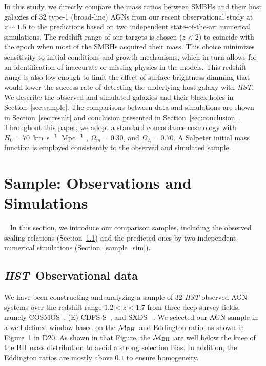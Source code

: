 \documentclass[twocolumn,trackchanges]{aastex63}
\newcommand{\hst}{{\it HST}}
\newcommand{\mbh}{$\mathcal M_{\rm BH}$}
\newcommand{\kmsMpc}{km~s$^{\rm -1}$~Mpc$^{\rm -1}$}
\begin{document}
In this study, we directly compare the mass ratios between SMBHs and their host galaxies of 32 type-1 (broad-line) AGNs from our recent observational study at $z\sim1.5$ \citep{Ding2020} to the predictions based on two independent state-of-the-art numerical simulations. The redshift range of our targets is chosen ($z<2$) to coincide with the epoch when most of the SMBHs acquired their mass. This choice minimizes sensitivity to initial conditions and growth mechanisms, which in turn allows for an identification of inaccurate or missing physics in the models. This redshift range is also low enough to limit the effect of surface brightness dimming that would lower the success rate of detecting the underlying host galaxy with \hst. We describe the observed and simulated galaxies and their black holes in Section~\ref{sec:sample}. The comparisons between data and simulations are shown in Section~\ref{sec:result} and conclusion presented in Section~\ref{sec:conclusion}. Throughout this paper, we adopt a standard concordance
cosmology with $H_0 = 70$~\kmsMpc
, $\Omega_m = 0.30$,
and $\Omega_\Lambda = 0.70$. A Salpeter initial mass function is employed consistently to the
observed and simulated sample.


\section{Sample: Observations and Simulations}~\label{sec:sample}
In this section, we introduce our comparison samples, including the observed scaling relations (Section~\ref{hst_sample}) and the predicted ones by two independent numerical simulations (Section~\ref{sample_sim}).
	
\subsection{\hst\ Observational data}\label{hst_sample}
	
We have been constructing and analyzing a sample of 32 \hst-observed AGN systems over the redshift range $1.2<z<1.7$ from three deep survey fields, namely COSMOS~\citep{Civano2016}, (E)-CDFS-S~\citep{Lehmer2005, Xue2011}, and SXDS~\citep{Ueda2008} \citep[][hereafter D20]{Ding2020}.
We selected our AGN sample in a well-defined window based on the \mbh\ and Eddington ratio, as shown in Figure~1 in D20. As shown in that Figure, the \mbh\ are well below the knee of the BH mass distribution to avoid a strong selection bias. In addition, the Eddington ratios are mostly above $0.1$ to ensure homogeneity.
\end{document}
